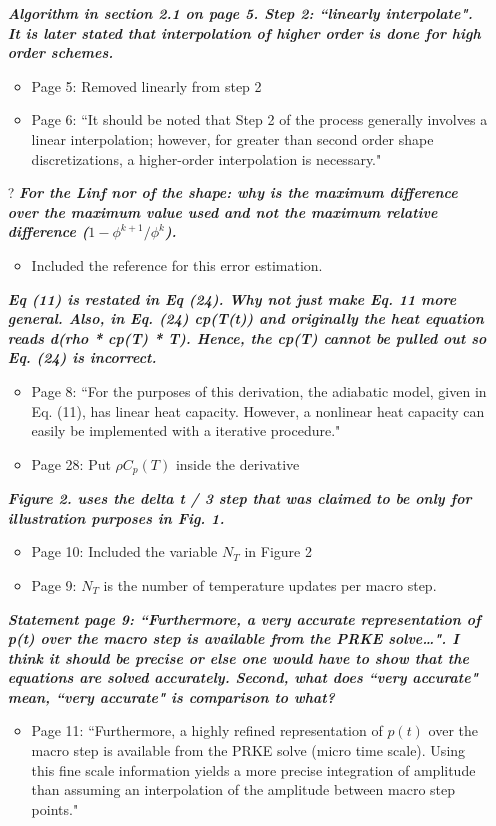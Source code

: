 \documentclass{elsarticle}
\newcommand{\nofix}{?}
\newcommand{\done}{\checkmark}
\newcommand{\easy}[1]{\textbf{\textit{#1}}}
\newcommand{\medm}[1]{\textbf{\textit{#1}}}
\begin{document}
\begin{itemize}
\item[\done] \easy{ Algorithm in section 2.1 on page 5. Step 2: ``linearly interpolate". It is later stated that interpolation of higher order is done for high order schemes. }
\begin{itemize}
\item Page 5: Removed linearly from step 2
\item Page 6: ``It should be noted that Step 2 of the process generally involves a linear interpolation; however, for greater than second order shape discretizations, a higher-order interpolation is necessary."
\end{itemize}

\item[\nofix] \easy{ For the Linf nor of the shape: why is the maximum difference over the maximum value used and not the maximum relative difference ($1 - \phi^{k+1}/\phi^k$). }
\begin{itemize}
\item Included the reference for this error estimation.
\end{itemize}

\item[\done] \medm{ Eq (11) is restated in Eq (24). Why not just make Eq. 11 more general. Also, in Eq. (24) cp(T(t)) and originally the heat equation reads d(rho * cp(T) * T). Hence, the cp(T) cannot be pulled out so Eq. (24) is incorrect. }
\begin{itemize}
\item Page 8: ``For the purposes of this derivation, the adiabatic model, given in Eq. (11), has linear heat capacity. However, a nonlinear heat capacity can easily be implemented with a iterative procedure."
\item Page 28: Put $\rho C_p(T)$ inside the derivative 
\end{itemize}

\item[\done] \easy{ Figure 2. uses the delta t / 3 step that was claimed to be only for illustration purposes in Fig. 1. }
\begin{itemize}
\item Page 10: Included the variable $N_{T}$ in Figure 2
\item Page 9: $N_T$ is the number of temperature updates per macro step.
\end{itemize}

\item[\done] \medm{ Statement page 9: ``Furthermore, a very accurate representation of p(t) over the macro step is available from the PRKE solve…". I think it should be precise or else one would have to show that the equations are solved accurately. Second, what does ``very accurate" mean, ``very accurate" is comparison to what? }
\begin{itemize}
\item Page 11: ``Furthermore, a highly refined representation of $p(t)$ over the macro step is available from the PRKE solve (micro time scale). Using this fine scale information yields a more precise integration of amplitude than assuming an interpolation of the amplitude between macro step points."
\end{itemize}


\end{itemize}
\end{document}
